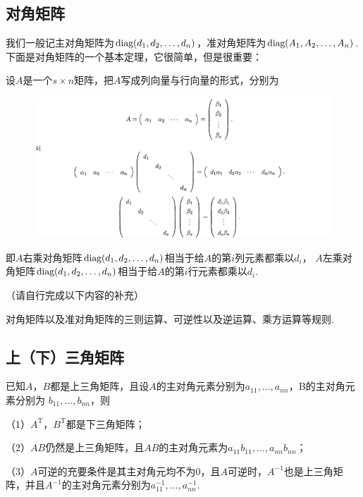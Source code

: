 \subsection{对角矩阵}
我们一般记主对角矩阵为$\textup{diag}(d_1,d_2,\dots,d_n)$，准对角矩阵为$\textup{diag}(A_1,A_2,\dots,A_n)$.
下面是对角矩阵的一个基本定理，它很简单，但是很重要：
\begin{theorem}
	设$A$是一个$s \times n$矩阵，把$A$写成列向量与行向量的形式，分别为
	\begin{figure}[h]
		\centering
		\includegraphics[scale=0.6]{./figs/9/9-1.png}
	\end{figure}
	
	即$A$右乘对角矩阵$\textup{diag}(d_1,d_2,\dots,d_n)$相当于给$A$的第$i$列元素都乘以$d_i$，
	$A$左乘对角矩阵$\textup{diag}(d_1,d_2,\dots,d_n)$相当于给$A$的第$i$行元素都乘以$d_i$.
\end{theorem}
\begin{theorem}
	（请自行完成以下内容的补充）

	对角矩阵以及准对角矩阵的三则运算、可逆性以及逆运算、乘方运算等规则.
\end{theorem}

\subsection{上（下）三角矩阵}
\begin{theorem}
	已知$A$，$B$都是上三角矩阵，且设$A$的主对角元素分别为$a_{11},\dots,a_{nn}$，B的主对角元素分别为
	$b_{11},\dots,b_{nn}$，则
	
	\textup{（1）}$A^{\mathrm{T}}$，$B^\mathrm{T}$都是下三角矩阵；
	
	\textup{（2）}$AB$仍然是上三角矩阵，且$AB$的主对角元素为$a_{11}b_{11},\dots,a_{nn}b_{nn}$；
	
	\textup{（3）}$A$可逆的充要条件是其主对角元均不为$0$，且$A$可逆时，$A^{-1}$也是上三角矩阵，并且$A^{-1}$的主对角元素分别为$a_{11}^{-1},\dots,a_{nn}^{-1}$.
\end{theorem}

